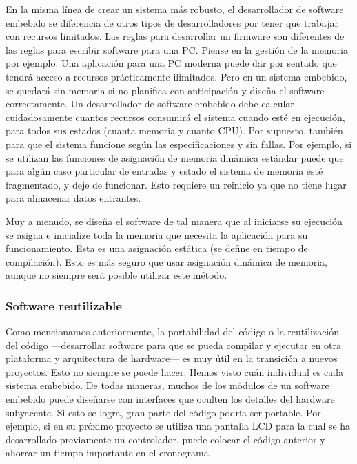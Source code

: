 \documentclass[output=paper, 
colorlinks,
citecolor=brown,
newtxmath
]{langscibook}
\begin{document}
En la misma línea de crear un sistema más robusto, el desarrollador
de software embebido se diferencia de otros tipos de desarrolladores
por tener que trabajar con recursos limitados.
Las reglas para desarrollar un firmware son diferentes de las reglas para 
escribir software para una PC. Piense en la gestión de la memoria por ejemplo.
Una aplicación para una PC moderna puede dar por sentado que tendrá acceso a recursos prácticamente ilimitados. Pero en un sistema embebido, se quedará sin memoria si no planifica con anticipación y diseña el software correctamente.
Un desarrollador de software embebido debe calcular cuidadosamente cuantos
recursos consumirá el sistema cuando esté en ejecución, para todos sus estados
(cuanta memoria y cuanto CPU).
Por supuesto, también para que el sistema funcione según 
las especificaciones y sin fallas. Por ejemplo, 
si se utilizan las funciones de asignación de memoria dinámica 
estándar puede que para algún caso particular de entradas
y estado el sistema de memoria esté fragmentado, y deje de funcionar.
Esto requiere un reinicio ya que no tiene lugar para almacenar datos entrantes.

Muy a menudo, se diseña el software de tal manera que al iniciarse
su ejecución se asigna e inicialize toda la memoria que necesita la aplicación
para su funcionamiento. Esta es una asignación estática (se define
en tiempo de compilación).
Esto es más seguro que usar asignación dinámica de memoria, 
aunque no siempre será posible utilizar este método.




\subsubsection {Software reutilizable}

Como mencionamos anteriormente, la portabilidad del código o la 
reutilización del código —desarrollar software para que se pueda compilar
y ejecutar en otra plataforma y arquitectura de hardware— es muy 
útil en la transición a nuevos proyectos. Esto no siempre se puede hacer.
Hemos visto cuán individual es cada sistema embebido. 
De todas maneras, muchos de los módulos de un software embebido
puede diseñarse con interfaces que oculten los detalles del hardware
subyacente. Si esto se logra, gran parte del código podría ser portable.
Por ejemplo, si en su próximo proyecto se utiliza una pantalla LCD 
para la cual se ha desarrollado previamente un controlador, 
puede colocar el código anterior y ahorrar un tiempo importante en el cronograma.
\end{document}
